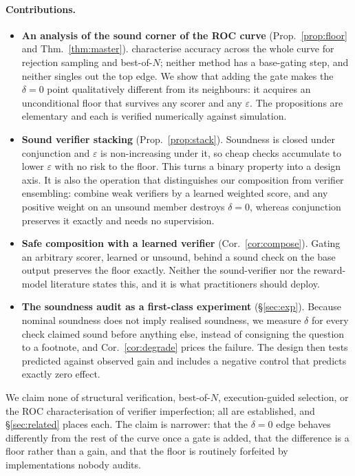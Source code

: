 \documentclass[11pt]{article}
\begin{document}
\paragraph{Contributions.}
\begin{itemize}\setlength\itemsep{0.15em}
\item \textbf{An analysis of the sound corner of the ROC curve} (Prop.~\ref{prop:floor} and Thm.~\ref{thm:master}). \citet{dorner2025rocnreroll} characterise accuracy across the whole curve for rejection sampling and best-of-$N$; neither method has a base-gating step, and neither singles out the top edge. We show that adding the gate makes the $\delta=0$ point qualitatively different from its neighbours: it acquires an unconditional floor that survives any scorer and any $\varepsilon$. The propositions are elementary and each is verified numerically against simulation.
\item \textbf{Sound verifier stacking} (Prop.~\ref{prop:stack}). Soundness is closed under conjunction and $\varepsilon$ is non-increasing under it, so cheap checks accumulate to lower $\varepsilon$ with no risk to the floor. This turns a binary property into a design axis. It is also the operation that distinguishes our composition from verifier ensembling: \citet{saadfalcon2025weaver} combine weak verifiers by a learned weighted score, and any positive weight on an unsound member destroys $\delta=0$, whereas conjunction preserves it exactly and needs no supervision.
\item \textbf{Safe composition with a learned verifier} (Cor.~\ref{cor:compose}). Gating an arbitrary scorer, learned or unsound, behind a sound check on the base output preserves the floor exactly. Neither the sound-verifier nor the reward-model literature states this, and it is what practitioners should deploy.
\item \textbf{The soundness audit as a first-class experiment} (\S\ref{sec:exp}). Because nominal soundness does not imply realised soundness, we measure $\delta$ for every check claimed sound before anything else, instead of consigning the question to a footnote, and Cor.~\ref{cor:degrade} prices the failure. The design then tests predicted against observed gain and includes a negative control that predicts exactly zero effect.
\end{itemize}

We claim none of structural verification, best-of-$N$, execution-guided selection, or the ROC characterisation of verifier imperfection; all are established, and \S\ref{sec:related} places each. The claim is narrower: that the $\delta=0$ edge behaves differently from the rest of the curve once a gate is added, that the difference is a floor rather than a gain, and that the floor is routinely forfeited by implementations nobody audits.
\end{document}
